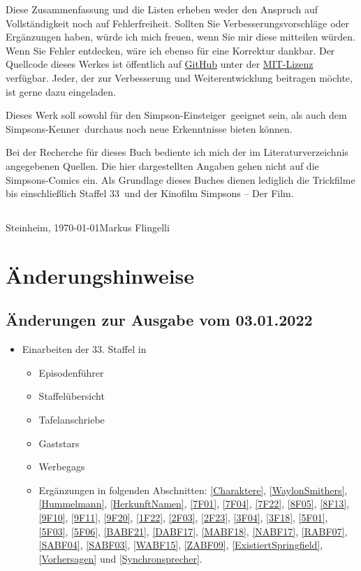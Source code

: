 \documentclass[pagesize,twoside,german]{scrbook}
\newcommand{\staffelAnzahl}{33}
\begin{document}
Diese Zusammenfassung und die Listen erheben weder den Anspruch auf Voll\-stän\-dig\-keit noch auf Fehlerfreiheit. Sollten Sie Verbesserungsvorschläge oder Er\-gänz\-un\-gen haben, würde ich mich freuen, wenn Sie mir diese mitteilen würden. Wenn Sie Fehler entdecken, wäre ich ebenso für eine Korrektur dankbar. Der Quellcode dieses Werkes ist öffentlich auf \href{https://github.com/mflingelli/simpsons}{GitHub} unter der \href{https://github.com/mflingelli/simpsons/blob/development/LICENSE.md}{MIT-Lizenz} verfügbar. Jeder, der zur Verbesserung und Weiterentwicklung beitragen möchte, ist gerne dazu eingeladen.

Dieses Werk soll sowohl für den \glqq Simpson-Einsteiger\grqq\ geeignet sein, als auch dem \glqq Simpsons-Kenner\grqq\ durchaus noch neue Erkenntnisse bieten können.

Bei der Recherche für dieses Buch bediente ich mich der im Literaturverzeichnis angegebenen Quellen. Die hier dargestellten Angaben gehen nicht auf die Simpsons-Comics ein. Als Grundlage dieses Buches dienen lediglich die Trickfilme bis einschließlich Staffel \staffelAnzahl\ und der Kinofilm \glqq Simpsons -- Der Film\grqq .

\subsection*{}
{
Steinheim, \today \hfill Markus Flingelli
}


\section*{Änderungshinweise}

\subsection*{Änderungen zur Ausgabe vom 03.01.2022}
\begin{itemize}
	\item Einarbeiten der 33. Staffel in
	\begin{itemize}
		\item Episodenführer
		\item Staffelübersicht
		\item Tafelanschriebe
		\item Gaststars
		\item Werbegags
		\item Ergänzungen in folgenden Abschnitten: \ref{Charaktere}, \ref{WaylonSmithers}, \ref{Hummelmann}, \ref{HerkunftNamen}, \ref{7F01}, \ref{7F04}, \ref{7F22}, \ref{8F05}, \ref{8F13}, \ref{9F10}, \ref{9F11}, \ref{9F20}, \ref{1F22}, \ref{2F03}, \ref{2F23}, \ref{3F04}, \ref{3F18}, \ref{5F01}, \ref{5F03}, \ref{5F06}, \ref{BABF21}, \ref{DABF17}, \ref{MABF18}, \ref{NABF17}, \ref{RABF07}, \ref{SABF04}, \ref{SABF03}, \ref{WABF15}, \ref{ZABF09}, \ref{ExistiertSpringfield}, \ref{Vorhersagen} und \ref{Synchronsprecher}.
	\end{itemize}
\end{itemize}
\end{document}
